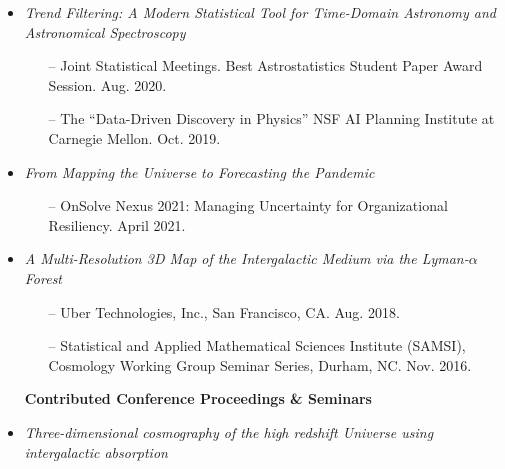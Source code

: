 \documentclass[letterpaper,10pt]{article}
\begin{document}
\begin{itemize}
\vspace{0.15cm}


\item {\it Trend Filtering: A Modern Statistical Tool for Time-Domain Astronomy and Astronomical Spectroscopy}

\begin{itemize}
\item[--] Joint Statistical Meetings. Best Astrostatistics Student Paper Award Session. Aug. 2020.

\vspace{0.05cm}

\item[--] The ``Data-Driven Discovery in Physics'' NSF AI Planning Institute at Carnegie Mellon. Oct. 2019.

\end{itemize}


\vspace{0.15cm}


\item {\it From Mapping the Universe to Forecasting the Pandemic}

\begin{itemize}
\item[--] OnSolve Nexus 2021: {Managing Uncertainty for Organizational Resiliency}. April 2021.
\end{itemize}


\vspace{0.15cm}


\item {\it A Multi-Resolution 3D Map of the Intergalactic Medium via the Lyman-$\alpha$ Forest}\\

\vspace{-0.5cm}

\begin{itemize}
\item[--] Uber Technologies, Inc., San Francisco, CA. Aug. 2018.

\item[--] Statistical and Applied Mathematical Sciences Institute (SAMSI), Cosmology Working Group Seminar Series, Durham, NC. Nov. 2016.
\end{itemize}


\vspace{0.2cm}


\item[] \hspace{-6ex} {\bf Contributed Conference Proceedings \& Seminars} 
\item {\it Three-dimensional cosmography of the high redshift Universe using intergalactic absorption}


\end{itemize}
\end{document}
